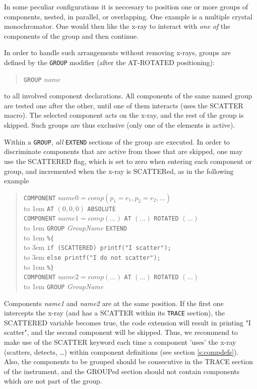 In some peculiar configurations it is neccesary to position one or
more groups of components, nested, in parallel, or overlapping. One
example is a multiple crystal monochromator. One would then like the
x-ray to interact with \emph{one of} the components of the group
and then continue.

In order to handle such arrangements without removing x-rays, groups are defined by the \texttt{GROUP} modifier (after the AT-ROTATED positioning):
\begin{quote}
  \texttt{GROUP} \textit{name}
\end{quote}
to all involved component declarations. 
All components of the same named group are tested one after the other,
until one of them interacts (uses the SCATTER
macro). The selected component acts on
the x-ray, and the rest of the group is skipped. Such groups are thus exclusive (only one of the elements is active).

Within a \texttt{GROUP}, \emph{all} \texttt{EXTEND} sections of the group are executed. In order to discriminate components that are active from those that are skipped, one may use the SCATTERED flag, which is set to zero when entering each component or group, and incremented when the x-ray is SCATTERed, as in the following example  
\begin{quote}
  \texttt{COMPONENT} $\textit{name0} =
    \textit{comp}(p_1 = e_1, p_2 = e_2, \ldots)$ \\
    \hbox to 1em{} \texttt{AT} $(0,0,0)$ \texttt{ABSOLUTE} \\
  \texttt{COMPONENT} $\textit{name1} =
    \textit{comp}(\ldots)$ \texttt{AT} $(...)$  \texttt{ROTATED} $(...)$ \\
  \hbox to 1em{} \texttt{GROUP} \textit{GroupName} \texttt{EXTEND} \\
  \hbox to 1em{} \verb|%{| \\
  \hbox to 3em{} \verb+if (SCATTERED) printf("I scatter");+\\
  \hbox to 3em{} \verb+else printf("I do not scatter");+\\
  \hbox to 1em{} \verb|%}| \\
  \texttt{COMPONENT} $\textit{name2} =
    \textit{comp}(\ldots)$ \texttt{AT} $(...)$ \texttt{ROTATED} $(...)$ \\
  \hbox to 1em{} \texttt{GROUP} \textit{GroupName}
\end{quote}
Components \emph{name1} and \emph{name2} are at the same position. If the first one intercepts the x-ray (and has a SCATTER within its \texttt{TRACE} section), the SCATTERED variable becomes true, the code extension will result in printing "I scatter", and the second component will be skipped.
Thus, we recommend to make use of the SCATTER keyword each time a component 'uses' the x-ray (scatters, detects, \ldots) within component definitions (see section \ref{s:compdefs}). Also, the components to be grouped should be consecutive in the TRACE section of the instrument, and the GROUPed section should not contain components which are not part of the group.

